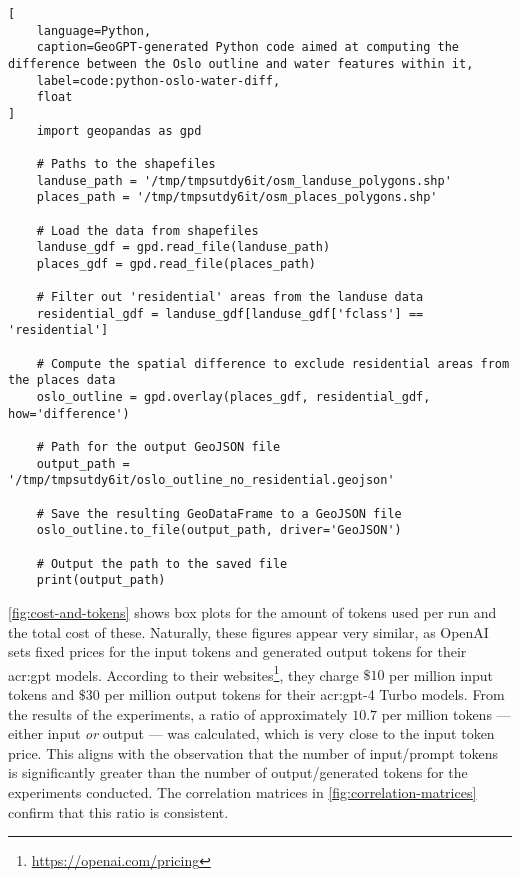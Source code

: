 \begin{lstlisting}[
    language=Python,
    caption=GeoGPT-generated Python code aimed at computing the difference between the Oslo outline and water features within it,
    label=code:python-oslo-water-diff,
    float
]
    import geopandas as gpd

    # Paths to the shapefiles
    landuse_path = '/tmp/tmpsutdy6it/osm_landuse_polygons.shp'
    places_path = '/tmp/tmpsutdy6it/osm_places_polygons.shp'
    
    # Load the data from shapefiles
    landuse_gdf = gpd.read_file(landuse_path)
    places_gdf = gpd.read_file(places_path)
    
    # Filter out 'residential' areas from the landuse data
    residential_gdf = landuse_gdf[landuse_gdf['fclass'] == 'residential']
     
    # Compute the spatial difference to exclude residential areas from the places data
    oslo_outline = gpd.overlay(places_gdf, residential_gdf, how='difference')
    
    # Path for the output GeoJSON file
    output_path = '/tmp/tmpsutdy6it/oslo_outline_no_residential.geojson'
    
    # Save the resulting GeoDataFrame to a GeoJSON file
    oslo_outline.to_file(output_path, driver='GeoJSON')
    
    # Output the path to the saved file
    print(output_path)    
\end{lstlisting}

\autoref{fig:cost-and-tokens} shows box plots for the amount of tokens used per run and the total cost of these. Naturally, these figures appear very similar, as OpenAI sets fixed prices for the input tokens and generated output tokens for their \acrshort{acr:gpt} models. According to their websites\footnote{\url{https://openai.com/pricing}}, they charge $\$10$ per million input tokens and $\$30$ per million output tokens for their \acrshort{acr:gpt}-4 Turbo models. From the results of the experiments, a ratio of approximately $10.7$ per million tokens --- either input \textit{or} output --- was calculated, which is very close to the input token price. This aligns with the observation that the number of input/prompt tokens is significantly greater than the number of output/generated tokens for the experiments conducted. The correlation matrices in \autoref{fig:correlation-matrices} confirm that this ratio is consistent.

